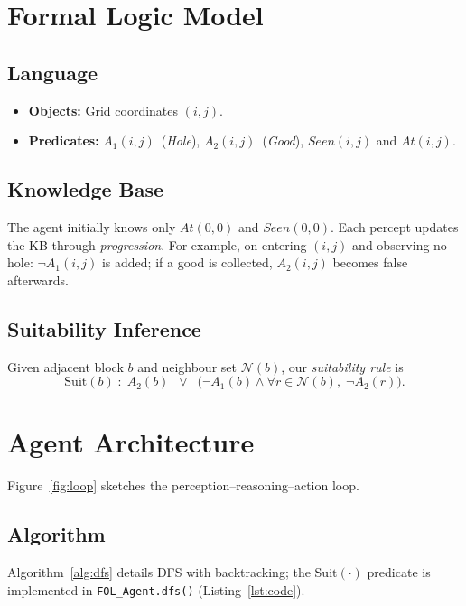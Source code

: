 \documentclass[12pt]{article}
\begin{document}
\section{Formal Logic Model}\label{sec:logic}
\subsection{Language}
\begin{itemize}
    \item \textbf{Objects:} Grid coordinates $(i,j)$.
    \item \textbf{Predicates:}
          \(A_1(i,j)\)~(\emph{Hole}),
          \(A_2(i,j)\)~(\emph{Good}),
          \(Seen(i,j)\) and \(At(i,j)\).
\end{itemize}

\subsection{Knowledge Base}
The agent initially knows only \(At(0,0)\) and \(Seen(0,0)\).
Each percept updates the KB through \emph{progression}.  
For example, on entering $(i,j)$ and observing no hole:
\(\neg A_1(i,j)\) is added; if a good is collected,
\(A_2(i,j)\) becomes false afterwards.

\subsection{Suitability Inference}
Given adjacent block $b$ and neighbour set $\mathcal{N}(b)$, our
\emph{suitability rule} is
\begin{equation}
    \mathrm{Suit}(b) \;:\; A_2(b)
    \;\;\lor\;\;
    \bigl(\neg A_1(b) \land \forall r\!\in\!\mathcal{N}(b),\; \neg A_2(r)\bigr).
    \label{eq:suitability}
\end{equation}

\section{Agent Architecture}\label{sec:agent}
Figure~\ref{fig:loop} sketches the perception–reasoning–action loop.


\subsection{Algorithm}
Algorithm~\ref{alg:dfs} details DFS with backtracking; the
\(\mathrm{Suit}(\cdot)\) predicate is implemented in
\texttt{FOL\_Agent.dfs()} (Listing~\ref{lst:code}).
\end{document}
